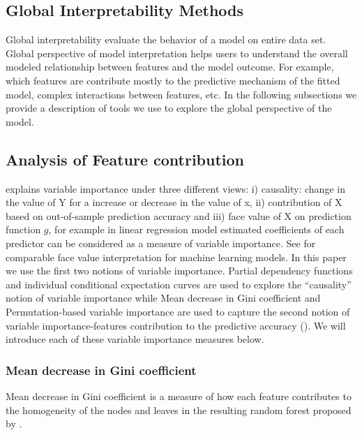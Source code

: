 \documentclass[11pt,a4paper,]{article}
\begin{document}
\subsection{Global Interpretability
Methods}\label{global-interpretability-methods}

Global interpretability evaluate the behavior of a model on entire data
set. Global perspective of model interpretation helps users to
understand the overall modeled relationship between features and the
model outcome. For example, which features are contribute mostly to the
predictive mechanism of the fitted model, complex interactions between
features, etc. In the following subsections we provide a description of
tools we use to explore the global perspective of the model.

\subsection{Analysis of Feature
contribution}\label{analysis-of-feature-contribution}

\textcite{jiang2002} explains variable importance under three different
views: i) causality: change in the value of Y for a increase or decrease
in the value of x, ii) contribution of X based on out-of-sample
prediction accuracy and iii) face value of X on prediction function
\(g\), for example in linear regression model estimated coefficients of
each predictor can be considered as a measure of variable importance.
See \textcite{jiang2002} for comparable face value interpretation for
machine learning models. In this paper we use the first two notions of
variable importance. Partial dependency functions and individual
conditional expectation curves are used to explore the ``causality''
notion of variable importance while Mean decrease in Gini coefficient
and Permutation-based variable importance are used to capture the second
notion of variable importance-features contribution to the predictive
accuracy (\textcite{Zhao}). We will introduce each of these variable
importance measures below.

\subsubsection{Mean decrease in Gini
coefficient}\label{mean-decrease-in-gini-coefficient}

Mean decrease in Gini coefficient is a measure of how each feature
contributes to the homogeneity of the nodes and leaves in the resulting
random forest proposed by \textcite{breiman2001random}.
\end{document}
